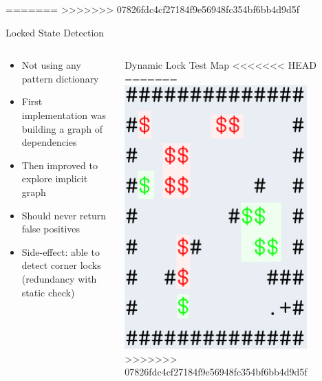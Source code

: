 \documentclass{beamer}
\begin{document}
=======
>>>>>>> 07826fdc4cf27184f9e56948fc354bf6bb4d9d5f
\begin{frame}{Locked State Detection}
  \begin{columns}
    \begin{column}{.5\textwidth}
      \begin{itemize}
        \item Not using any pattern dictionary
        \item First implementation was building a graph of dependencies
        \item Then improved to explore implicit graph
        \item Should never return false positives
        \item Side-effect: able to detect corner locks (redundancy with static check)
      \end{itemize}
    \end{column}
    \begin{column}{.5\textwidth}
      \begin{block}{Dynamic Lock Test Map}
        \centering
<<<<<<< HEAD
        \usebox{\maplocked}
=======
        \includegraphics[width=0.8\textwidth]{dynamic.png}
>>>>>>> 07826fdc4cf27184f9e56948fc354bf6bb4d9d5f
      \end{block}
    \end{column}
  \end{columns}

\end{frame}
\end{document}
